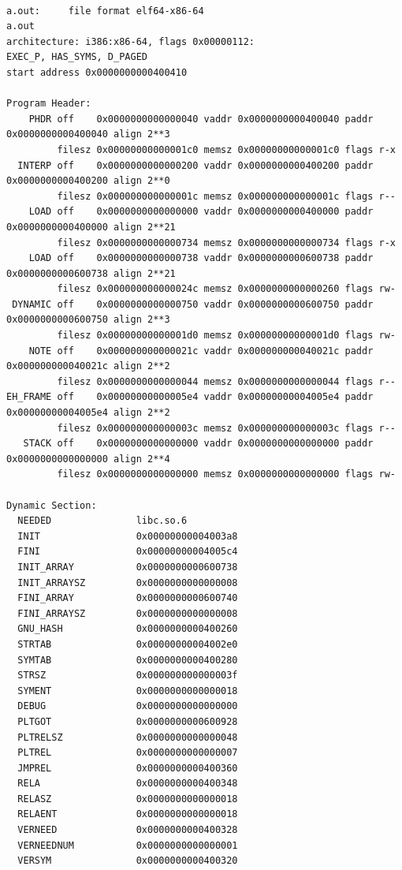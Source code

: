   \begin{verbatim}

a.out:     file format elf64-x86-64
a.out
architecture: i386:x86-64, flags 0x00000112:
EXEC_P, HAS_SYMS, D_PAGED
start address 0x0000000000400410

Program Header:
    PHDR off    0x0000000000000040 vaddr 0x0000000000400040 paddr 0x0000000000400040 align 2**3
         filesz 0x00000000000001c0 memsz 0x00000000000001c0 flags r-x
  INTERP off    0x0000000000000200 vaddr 0x0000000000400200 paddr 0x0000000000400200 align 2**0
         filesz 0x000000000000001c memsz 0x000000000000001c flags r--
    LOAD off    0x0000000000000000 vaddr 0x0000000000400000 paddr 0x0000000000400000 align 2**21
         filesz 0x0000000000000734 memsz 0x0000000000000734 flags r-x
    LOAD off    0x0000000000000738 vaddr 0x0000000000600738 paddr 0x0000000000600738 align 2**21
         filesz 0x000000000000024c memsz 0x0000000000000260 flags rw-
 DYNAMIC off    0x0000000000000750 vaddr 0x0000000000600750 paddr 0x0000000000600750 align 2**3
         filesz 0x00000000000001d0 memsz 0x00000000000001d0 flags rw-
    NOTE off    0x000000000000021c vaddr 0x000000000040021c paddr 0x000000000040021c align 2**2
         filesz 0x0000000000000044 memsz 0x0000000000000044 flags r--
EH_FRAME off    0x00000000000005e4 vaddr 0x00000000004005e4 paddr 0x00000000004005e4 align 2**2
         filesz 0x000000000000003c memsz 0x000000000000003c flags r--
   STACK off    0x0000000000000000 vaddr 0x0000000000000000 paddr 0x0000000000000000 align 2**4
         filesz 0x0000000000000000 memsz 0x0000000000000000 flags rw-

Dynamic Section:
  NEEDED               libc.so.6
  INIT                 0x00000000004003a8
  FINI                 0x00000000004005c4
  INIT_ARRAY           0x0000000000600738
  INIT_ARRAYSZ         0x0000000000000008
  FINI_ARRAY           0x0000000000600740
  FINI_ARRAYSZ         0x0000000000000008
  GNU_HASH             0x0000000000400260
  STRTAB               0x00000000004002e0
  SYMTAB               0x0000000000400280
  STRSZ                0x000000000000003f
  SYMENT               0x0000000000000018
  DEBUG                0x0000000000000000
  PLTGOT               0x0000000000600928
  PLTRELSZ             0x0000000000000048
  PLTREL               0x0000000000000007
  JMPREL               0x0000000000400360
  RELA                 0x0000000000400348
  RELASZ               0x0000000000000018
  RELAENT              0x0000000000000018
  VERNEED              0x0000000000400328
  VERNEEDNUM           0x0000000000000001
  VERSYM               0x0000000000400320


\end{verbatim}
